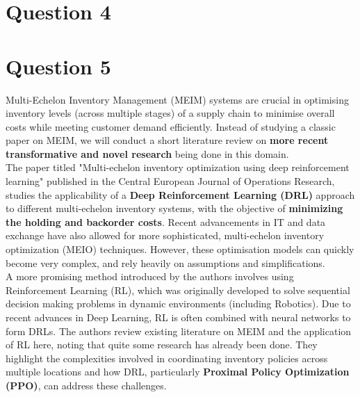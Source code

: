 \documentclass[12pt]{article}
\begin{document}


\newpage

\section*{Question 4}


\newpage 

\section*{Question 5}


Multi-Echelon Inventory Management (MEIM) systems are crucial in optimising inventory levels (across multiple stages) of a supply chain to minimise overall costs while meeting customer demand efficiently. Instead of studying a classic paper on MEIM, we will conduct a short literature review on \textbf{more recent transformative and novel research} being done in this domain. \\

\noindent The paper titled "Multi-echelon inventory optimization using deep reinforcement learning" \cite{Geevers2023} published in the Central European Journal of Operations Research, studies the applicability of a \textbf{Deep Reinforcement Learning (DRL)} approach to different multi-echelon inventory systems, with the objective of \textbf{minimizing the holding and backorder costs}. Recent advancements in IT and data exchange have also allowed for more sophisticated, multi-echelon inventory optimization (MEIO) techniques. However, these optimisation models can quickly become very complex, and rely heavily on assumptions and simplifications. \\ 

\noindent A more promising method introduced by the authors involves using Reinforcement Learning (RL), which was originally developed to solve sequential decision making problems in dynamic environments (including Robotics). Due to recent advances in Deep Learning, RL is often combined with neural networks to form DRLs. The authors review existing literature on MEIM and the application of RL here, noting that quite some research has already been done. They highlight the complexities involved in coordinating inventory policies across multiple locations and how DRL, particularly \textbf{Proximal Policy Optimization (PPO)}, can address these challenges. \\ 
\end{document}
